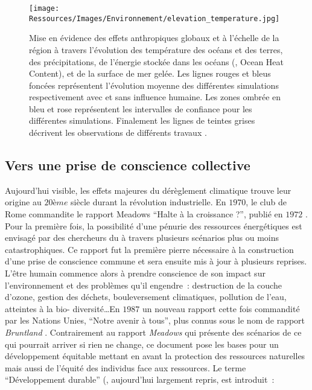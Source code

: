 \begin{figure}
    \centering
    \texttt{[image: Ressources/Images/Environnement/elevation\_temperature.jpg]}
    \caption{Mise en évidence des effets anthropiques globaux et à l’échelle de la région
              à travers l’évolution des température des océans et des terres, des précipitations,
              de l’énergie stockée dans les océans (, Ocean Heat Content), et
              de la surface de mer gelée. Les lignes rouges et bleus foncées représentent l’évolution moyenne
              des différentes simulations respectivement avec et sans influence humaine. Les zones
              ombrée en bleu et rose représentent les intervalles de confiance pour les différentes
              simulations. Finalement les lignes de teintes grises décrivent les observations
              de différents travaux \parencite{AchutaRao2013}.
             }
    \label{fig:evolution_climat}
\end{figure}

\subsection{Vers une prise de conscience collective} %
\label{sub:vers_une_prise_de_conscience_collective}
Aujourd’hui visible, les effets majeures du dérèglement climatique trouve leur origine au
$20ème$ siècle durant la révolution industrielle. En $1970$, le club de Rome commandite le
rapport Meadows \enquote{Halte à la croissance ?}, publié en $1972$
\parencite{Meadows1972}. Pour la première fois, la possibilité d’une pénurie des
ressources énergétiques est envisagé par des chercheurs du  à travers plusieurs
scénarios plus ou moins catastrophiques. Ce rapport fut la première pierre nécessaire à la
construction d’une prise de conscience commune et sera ensuite mis à jour à plusieurs
reprises. L’être humain commence alors à prendre conscience de son impact sur
l’environnement et des problèmes qu’il engendre~: destruction de la couche d’ozone,
gestion des déchets, bouleversement climatiques, pollution de l’eau, atteintes à la bio-
diversité\dots En $1987$ un nouveau rapport cette fois commandité par les Nations Unies,
\enquote{Notre avenir à tous}, plus connus sous le nom de rapport \textit{Bruntland} \parencite{Brundtland1987}.
Contrairement au rapport \textit{Meadows} qui présente des scénarios de ce qui pourrait
arriver si rien ne change, ce document pose les bases pour un développement équitable
mettant en avant la protection des ressources naturelles mais aussi de l’équité des
individus face aux ressources. Le terme \enquote{Développement durable} (,
aujourd’hui largement repris, est introduit~:

